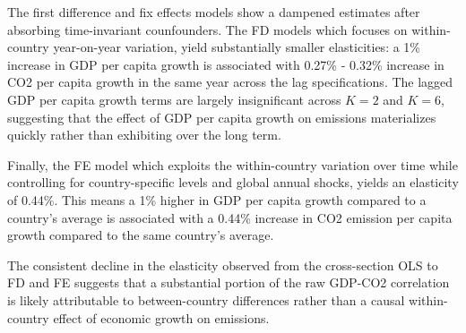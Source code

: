 \documentclass[12pt, a4paper]{article}
\begin{document}
The first difference and fix effects models show a dampened estimates after absorbing time-invariant counfounders. The FD models which focuses on within-country year-on-year variation, yield substantially smaller elasticities: a 1\% increase in GDP per capita growth is associated with 0.27\% - 0.32\% increase in CO2 per capita growth in the same year across the lag specifications. The lagged GDP per capita growth terms are largely insignificant across $K=2$ and $K=6$, suggesting that the effect of GDP per capita growth on emissions materializes quickly rather than exhibiting over the long term.

Finally, the FE model which exploits the within-country variation over time while controlling for country-specific levels and global annual shocks, yields an elasticity of 0.44\%. This means a 1\% higher in GDP per capita growth compared to a country's average is associated with a 0.44\% increase in CO2 emission per capita growth compared to the same country's average.

The consistent decline in the elasticity observed from the cross-section OLS to FD and FE suggests that a substantial portion of the raw GDP-CO2 correlation is likely attributable to between-country differences rather than a causal within-country effect of economic growth on emissions.
\end{document}

